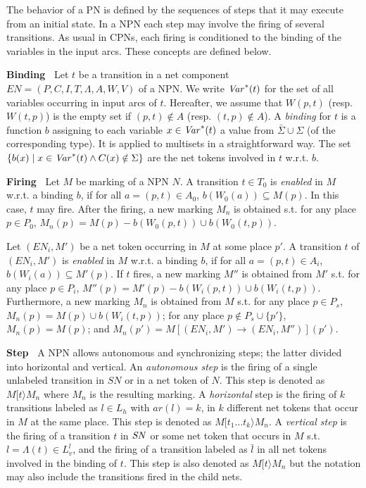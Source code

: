 \documentclass{llncs}
\begin{document}
The behavior of a PN is defined by the sequences of steps that it may execute from an initial state. In a NPN each step may involve the firing of several transitions. As usual in CPNs, each firing is conditioned to the binding of the variables in the input arcs. These concepts are defined below.

\noindent\textbf{Binding\ }  Let $t$ be a transition in a net component $EN=(P, C, I, T, \Lambda, A, W, V)$ of a NPN. We write ${\it Var}^*(t)$ for the set of all variables occurring in input arcs of $t$. Hereafter, we assume that $W(p,t)$ (resp. $W(t,p)$) is the empty set if $(p,t)\notin A$ (resp. $(t,p)\notin A$). A \emph{binding} for $t$ is a function $b$ assigning to each variable $x \in {\it Var}^*(t)$ a value from $\bar{\Sigma}\cup\Sigma$ (of the corresponding type). It is applied to multisets in a straightforward way. The set $\{b(x)\mid x\in {\it Var}^*(t) \wedge C(x)\notin\Sigma\}$ are the net tokens involved in $t$ w.r.t. $b$.

\noindent\textbf{Firing\ }  Let $M$ be marking of a NPN $N$. A transition $t\in T_0$ is \emph{enabled} in $M$ w.r.t. a binding $b$, if for all $a=(p, t)\in A_0$, $b(W_0(a))\subseteq M(p)$. In this case, $t$  may fire. After the firing, a new marking $M_n$ is obtained s.t. for any place $p\in P_0$, $M_n(p)=M(p)-b(W_0(p,t))\cup b(W_0(t,p))$.

Let $(EN_i,M')$ be a net token occurring in $M$ at some place $p'$. A transition $t$ of $(EN_i,M')$ is \emph{enabled} in $M$ w.r.t. a binding $b$, if for all $a=(p, t)\in A_i$, $b(W_i(a))\subseteq M'(p)$. If $t$ fires, a new marking $M''$ is obtained from $M'$ s.t. for any place $p\in P_i$, $M''(p)=M'(p)-b(W_i(p,t))\cup b(W_i(t,p))$. Furthermore, a new marking $M_n$ is obtained from $M$ s.t. for any place $p\in P_s$, $M_n(p)=M(p)\cup b(W_i(t,p))$; for any place $p\notin P_s\cup\{p'\}$, $M_n(p)=M(p)$; and $M_n(p')=M[(EN_i,M')\to (EN_i,M'')](p')$.


\noindent\textbf{Step\ } A NPN allows autonomous and synchronizing steps; the latter divided into horizontal and vertical. An \emph{autonomous step} is the firing of a single unlabeled transition in $SN$ or in a net token of $N$. This step is denoted as $M[t\rangle M_n$ where $M_n$ is the resulting marking.  A \emph{horizontal} step is the firing of $k$ transitions labeled as $l\in L_h$ with $ar(l)=k$, in $k$ different net tokens that occur in $M$ at the same place. This step is denoted as $M[t_1\ldots t_k\rangle M_n$. A \emph{vertical step} is the firing of a transition $t$ in ${\it SN}$ or some net token that occurs in $M$ s.t. $l=\Lambda(t)\in L_v^l$, and the firing of a transition labeled as $\bar{l}$ in all net tokens involved in the binding of $t$. This step is also denoted as $M[t\rangle M_n$ but the notation may also include the transitions fired in the child nets.
\end{document}

